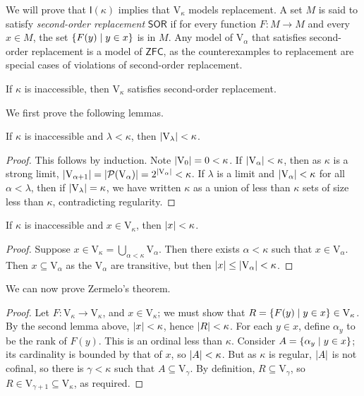We will prove that \( \mathsf{I}(\kappa) \) implies that \( \mathrm{V}_\kappa \) models replacement.
A set \( M \) is said to satisfy \emph{second-order replacement} \( \mathsf{SOR} \) if for every function \( F : M \to M \) and every \( x \in M \), the set \( \qty{F(y) \mid y \in x} \) is in \( M \).
Any model of \( \mathrm{V}_\alpha \) that satisfies second-order replacement is a model of \( \mathsf{ZFC} \), as the counterexamples to replacement are special cases of violations of second-order replacement.

\begin{theorem}[Zermelo]
    If \( \kappa \) is inaccessible, then \( \mathrm{V}_\kappa \) satisfies second-order replacement.
\end{theorem}
We first prove the following lemmas.
\begin{lemma}
    If \( \kappa \) is inaccessible and \( \lambda < \kappa \), then \( \abs{\mathrm{V}_\lambda} < \kappa \).
\end{lemma}
\begin{proof}
    This follows by induction.
    Note \( \abs{\mathrm{V}_0} = 0 < \kappa \).
    If \( \abs{\mathrm{V}_\alpha} < \kappa \), then as \( \kappa \) is a strong limit, \( \abs{\mathrm{V}_{\alpha + 1}} = \abs{\mathcal P(\mathrm{V}_\alpha)} = 2^{\abs{\mathrm{V}_\alpha}} < \kappa \).
    If \( \lambda \) is a limit and \( \abs{\mathrm{V}_\alpha} < \kappa \) for all \( \alpha < \lambda \), then if \( \abs{\mathrm{V}_\lambda} = \kappa \), we have written \( \kappa \) as a union of less than \( \kappa \) sets of size less than \( \kappa \), contradicting regularity.
\end{proof}
\begin{lemma}
    If \( \kappa \) is inaccessible and \( x \in \mathrm{V}_\kappa \), then \( \abs{x} < \kappa \).
\end{lemma}
\begin{proof}
    Suppose \( x \in \mathrm{V}_\kappa = \bigcup_{\alpha < \kappa} \mathrm{V}_\alpha \).
    Then there exists \( \alpha < \kappa \) such that \( x \in \mathrm{V}_\alpha \).
    Then \( x \subseteq \mathrm{V}_\alpha \) as the \( \mathrm{V}_\alpha \) are transitive, but then \( \abs{x} \leq \abs{\mathrm{V}_\alpha} < \kappa \).
\end{proof}
We can now prove Zermelo's theorem.
\begin{proof}
    Let \( F : \mathrm{V}_\kappa \to \mathrm{V}_\kappa \), and \( x \in \mathrm{V}_\kappa \); we must show that \( R = \qty{F(y) \mid y \in x} \in \mathrm{V}_\kappa \).
    By the second lemma above, \( \abs{x} < \kappa \), hence \( \abs{R} < \kappa \).
    For each \( y \in x \), define \( \alpha_y \) to be the rank of \( F(y) \).
    This is an ordinal less than \( \kappa \).
    Consider \( A = \qty{\alpha_y \mid y \in x} \); its cardinality is bounded by that of \( x \), so \( \abs{A} < \kappa \).
    But as \( \kappa \) is regular, \( \abs{A} \) is not cofinal, so there is \( \gamma < \kappa \) such that \( A \subseteq \mathrm{V}_\gamma \).
    By definition, \( R \subseteq \mathrm{V}_\gamma \), so \( R \in \mathrm{V}_{\gamma + 1} \subseteq \mathrm{V}_\kappa \), as required.
\end{proof}
